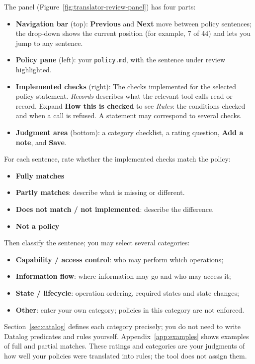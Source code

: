 \documentclass[10pt,letterpaper]{article}
\begin{document}
The panel (Figure~\ref{fig:translator-review-panel}) has four parts:
\begin{itemize}
\item \textbf{Navigation bar} (top): \textbf{Previous} and \textbf{Next} move
between policy sentences; the drop-down shows the current position (for
example, 7 of 44) and lets you jump to any sentence.
\item \textbf{Policy pane} (left): your \texttt{policy.md}, with the sentence
under review highlighted.
\item \textbf{Implemented checks} (right): The checks implemented for the
selected policy statement. \emph{Records} describes what the relevant tool
calls read or record. Expand \textbf{How this is checked} to see
\emph{Rules}: the conditions checked and when a call is refused. A statement
may correspond to several checks.
\item \textbf{Judgment area} (bottom): a category checklist, a rating question,
\textbf{Add a note}, and \textbf{Save}.
\end{itemize}

For each sentence, rate whether the implemented checks match the policy:
\begin{itemize}
\item \textbf{Fully matches}
\item \textbf{Partly matches}: describe what is missing or different.
\item \textbf{Does not match / not implemented}: describe the difference.
\item \textbf{Not a policy}
\end{itemize}
Then classify the sentence; you may select several categories:
\begin{itemize}
\item \textbf{Capability / access control}: who may perform which operations;
\item \textbf{Information flow}: where information may go and who may access it;
\item \textbf{State / lifecycle}: operation ordering, required states and state
changes;
\item \textbf{Other}: enter your own category; policies in this category are
not enforced.
\end{itemize}
Section~\ref{sec:catalog} defines each category precisely; you do not need to
write Datalog predicates and rules yourself. Appendix~\ref{app:examples} shows examples of full and partial matches. These ratings and categories are your judgments of how well your policies
were translated into rules; the tool does not assign them.
\end{document}
